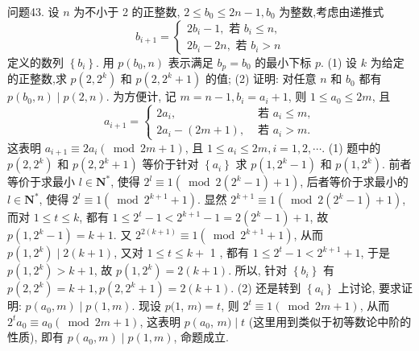 问题43. 设 $n$ 为不小于 2 的正整数, $2 \leqslant b_0 \leqslant 2 n-1, b_0$ 为整数,考虑由递推式
$$
b_{i+1}=\left\{\begin{array}{l}
2b_i-1, \text { 若 } b_i \leqslant n, \\
2b_i-2 n, \text { 若 } b_i>n
\end{array}\right.
$$
定义的数列 $\left\{b_i\right\}$. 用 $p\left(b_0, n\right)$ 表示满足 $b_p=b_0$ 的最小下标 $p$.
(1) 设 $k$ 为给定的正整数,求 $p\left(2,2^k\right)$ 和 $p\left(2,2^k+1\right)$ 的值;
(2) 证明: 对任意 $n$ 和 $b_0$ 都有 $p\left(b_0, n\right) \mid p(2, n)$.
为方便计, 记 $m=n-1, b_i=a_i+1$, 则 $1 \leqslant a_0 \leqslant 2 m$, 且
$$
a_{i+1}= \begin{cases}2 a_i, & \text { 若 } a_i \leqslant m, \\ 2 a_i-(2 m+1), & \text { 若 } a_i>m .\end{cases}
$$
这表明 $a_{i+1} \equiv 2 a_i(\bmod 2 m+1)$, 且 $1 \leqslant a_i \leqslant 2 m, i=1,2, \cdots$.
(1) 题中的 $p\left(2,2^k\right)$ 和 $p\left(2,2^k+1\right)$ 等价于针对 $\left\{a_i\right\}$ 求 $p\left(1,2^k-1\right)$ 和 $p\left(1,2^k\right)$. 前者等价于求最小 $l \in \mathbf{N}^*$, 使得 $2^l \equiv 1\left(\bmod 2\left(2^k-1\right)+1\right)$, 后者等价于求最小的 $l \in \mathbf{N}^*$, 使得 $2^l \equiv 1\left(\bmod 2^{k+1}+1\right)$.
显然 $2^{k+1} \equiv 1\left(\bmod 2\left(2^k-1\right)+1\right)$, 而对 $1 \leqslant t \leqslant k$, 都有 $1 \leqslant 2^t-1< 2^{k+1}-1=2\left(2^k-1\right)+1$, 故 $p\left(1,2^k-1\right)=k+1$.
又 $2^{2(k+1)} \equiv 1\left(\bmod 2^{k+1}+1\right)$, 从而 $p\left(1,2^k\right) \mid 2(k+1)$, 又对 $1 \leqslant t \leqslant k+$ 1 , 都有 $1 \leqslant 2^t-1<2^{k+1}+1$, 于是 $p\left(1,2^k\right)>k+1$, 故 $p\left(1,2^k\right)=2(k+1)$.
所以, 针对 $\left\{b_i\right\}$ 有 $p\left(2,2^k\right)=k+1, p\left(2,2^k+1\right)=2(k+1)$.
(2) 还是转到 $\left\{a_i\right\}$ 上讨论, 要求证明: $p\left(a_0, m\right) \mid p(1, m)$. 现设 $p(1$, $m)=t$, 则 $2^t \equiv 1(\bmod 2 m+1)$, 从而 $2^t a_0 \equiv a_0(\bmod 2 m+1)$, 这表明 $p\left(a_0\right.$, $m) \mid t$ (这里用到类似于初等数论中阶的性质), 即有 $p\left(a_0, m\right) \mid p(1, m)$, 命题成立.



